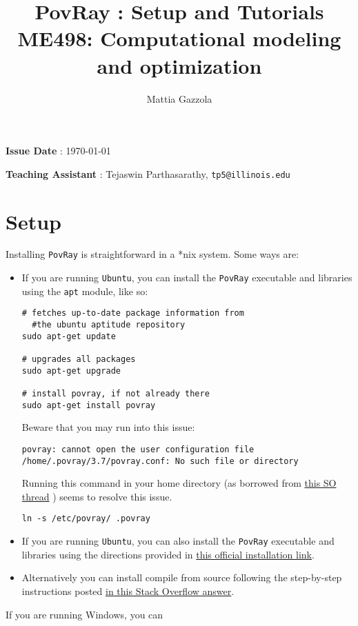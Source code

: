 \documentclass[11pt]{article}
\author{Mattia Gazzola}
\date{}
\title{PovRay : Setup and Tutorials\\\medskip
\large ME498: Computational modeling and optimization}
\begin{document}
\maketitle
\textbf{Issue Date} : \today

\textbf{Teaching Assistant} : Tejaswin Parthasarathy, \texttt{tp5@illinois.edu}

\section{Setup}
\label{sec:orgfe60fd4}
Installing \texttt{PovRay} is straightforward in a *nix system. Some ways are:

\begin{itemize}
\item If you are running \texttt{Ubuntu}, you can install the \texttt{PovRay} executable and
libraries using the \texttt{apt} module, like so:
\begin{verbatim}
# fetches up-to-date package information from
  #the ubuntu aptitude repository
sudo apt-get update

# upgrades all packages
sudo apt-get upgrade

# install povray, if not already there
sudo apt-get install povray
\end{verbatim}
Beware that you may run into this issue:

\texttt{povray: cannot open the user configuration file /home/.povray/3.7/povray.conf: No such file or directory}

Running this command in your home directory (as borrowed from \href{https://askubuntu.com/questions/628496/using-pov-ray-installed-via-the-apt}{this SO thread}
 ) seems to resolve this issue.

\texttt{ln -s /etc/povray/ .povray}

\item If you are running \texttt{Ubuntu}, you can also install the \texttt{PovRay} executable and
libraries using the directions provided in \href{http://www.povray.org/download/linux.php}{this official installation link}.
\item Alternatively you can install compile from source following the step-by-step
instructions posted \href{https://askubuntu.com/a/414192}{in this Stack Overflow answer}.
\end{itemize}

If you are running Windows, you can
\end{document}
